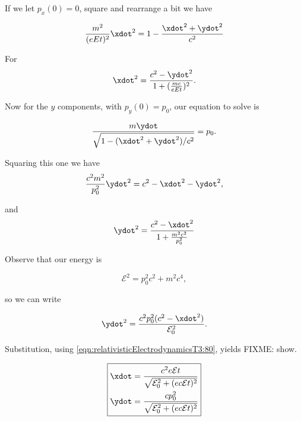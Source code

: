 If we let $p_x(0) = 0$, square and rearrange a bit we have

\begin{equation}\label{eqn:relativisticElectrodynamicsT3:70}
\frac{m^2}{(e E t)^2} \xdot^2 = 1 - \frac{\xdot^2 + \ydot^2}{c^2}
\end{equation}

For
\begin{equation}\label{eqn:relativisticElectrodynamicsT3:80}
\xdot^2 = \frac{c^2 - \ydot^2}{1 + (\frac{mc}{eEt})^2}.
\end{equation}

Now for the $y$ components, with $p_y(0) = p_0$, our equation to solve is

\begin{equation}\label{eqn:relativisticElectrodynamicsT3:82}
\frac{m \ydot}{\sqrt{1 - (\xdot^2 + \ydot^2)/c^2}} = p_0.
\end{equation}

Squaring this one we have
\begin{equation}\label{eqn:relativisticElectrodynamicsT3:84}
\frac{c^2 m^2}{p_0^2} \ydot^2 = c^2 - \xdot^2 - \ydot^2 ,
\end{equation}

and
\begin{equation}\label{eqn:relativisticElectrodynamicsT3:86}
\ydot^2 = \frac{ c^2 - \xdot^2}{1 + \frac{m^2 c^2}{p_0^2}}
\end{equation}

Observe that our energy is

\begin{equation}\label{eqn:relativisticElectrodynamicsT3:100}
\mathcal{E}^2 = p_0^2 c^2 + m^2 c^4,
\end{equation}

so we can write

\begin{equation}\label{eqn:relativisticElectrodynamicsT3:120}
\ydot^2 = \frac{ c^2 p_0^2 (c^2 - \xdot^2)}{ \mathcal{E}_0^2 }.
\end{equation}

Substitution, using \ref{eqn:relativisticElectrodynamicsT3:80}, yields
FIXME: show.

\begin{equation}\label{eqn:relativisticElectrodynamicsT3:140}
\boxed{
\begin{aligned}
\xdot &= \frac{c^2 e \mathcal{E} t}{\sqrt{ \mathcal{E}_0^2 + (e c \mathcal{E} t)^2 }} \\
\ydot &= \frac{c p_0^2 }{\sqrt{ \mathcal{E}_0^2 + (e c \mathcal{E} t)^2 }}
\end{aligned}
}
\end{equation}

